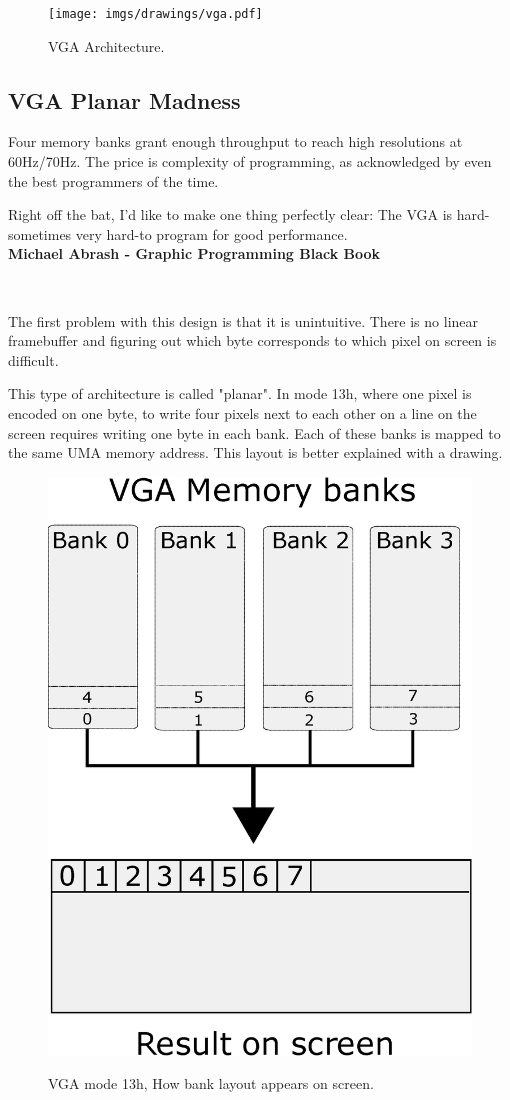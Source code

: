 \documentclass[book.tex]{subfiles}
\begin{document}
\begin{figure}[H]
\centering
\texttt{[image: imgs/drawings/vga.pdf]}
\caption{VGA Architecture.}
\label{fig:vga_arch}
\end{figure}




\subsection{VGA Planar Madness}

Four memory banks grant enough throughput to reach high resolutions at 60Hz/70Hz. The price is complexity of programming, as acknowledged by even the best programmers of the time.\\
 \begin{fancyquotes}
   Right off the bat, I'd like to make one thing perfectly clear: The VGA is hard-sometimes very hard-to program for good performance.
 \bigskip \\
\textbf{Michael Abrash - Graphic Programming Black Book}
 \end{fancyquotes}
 \\
\par
The first problem with this design is that it is unintuitive. There is no linear framebuffer and figuring out which byte corresponds to which pixel on screen is difficult.\\
\par
 This type of architecture is called "planar". In mode 13h, where one pixel is encoded on one byte, to write four pixels next to each other on a line on the screen requires writing one byte in each bank. Each of these banks is mapped to the same UMA memory address. This layout is better explained with a drawing.\\
\par
\begin{figure}[H]
\centering
\includegraphics[width=.57\textwidth]{imgs/drawings/vga_ram_screen_layout.eps}
\label{fig:vga_layout_banks}
\caption{VGA mode 13h, How bank layout appears on screen.}
\end{figure}
\end{document}
